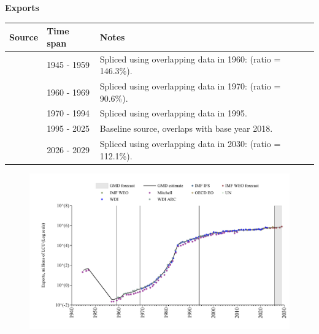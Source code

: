 \documentclass[12pt,a4paper,landscape]{article}
\begin{document}
\begin{adjustbox}{max totalsize={\paperwidth}{\paperheight},center}
\begin{minipage}[t][\textheight][t]{\textwidth}
\vspace*{0.5cm}
{}
\begin{center}
{\Large\bfseries Exports}
\end{center}
\vspace{0.5cm}
\begin{table}[H]
\centering
\small
\begin{tabular}{|l|l|l|}
\hline
\textbf{Source} & \textbf{Time span} & \textbf{Notes} \\
\hline
\rowcolor{white}\cite{Mitchell}& 1945 - 1959 &Spliced using overlapping data in 1960: (ratio = 146.3\%). \\
\rowcolor{lightgray}\cite{WDI_ARC}& 1960 - 1969 &Spliced using overlapping data in 1970: (ratio = 90.6\%). \\
\rowcolor{white}\cite{WDI}& 1970 - 1994 &Spliced using overlapping data in 1995. \\
\rowcolor{lightgray}\cite{OECD_EO}& 1995 - 2025 &Baseline source, overlaps with base year 2018. \\
\rowcolor{white}\cite{IMF_WEO_forecast}& 2026 - 2029 &Spliced using overlapping data in 2030: (ratio = 112.1\%). \\
\hline
\end{tabular}
\end{table}
\begin{figure}[H]
\centering
\includegraphics[width=\textwidth,height=0.6\textheight,keepaspectratio]{graphs/ISR_exports.pdf}
\end{figure}
\end{minipage}
\end{adjustbox}
\end{document}
